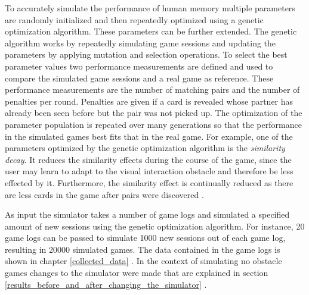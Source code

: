 To accurately simulate the performance of human memory multiple parameters are randomly initialized and then repeatedly optimized using a genetic optimization algorithm. These parameters can be further extended. The genetic algorithm works by repeatedly simulating game sessions and updating the parameters by applying mutation and selection operations. To select the best parameter values two performance measurements are defined and used to compare the simulated game sessions and a real game as reference. These performance measurements are the number of matching pairs and the number of penalties per round. Penalties are given if a card is revealed whose partner has already been seen before but the pair was not picked up. The optimization of the parameter population is repeated over many generations so that the performance in the simulated games best fits that in the real game. For example, one of the parameters optimized by the genetic optimization algorithm is the \textit{similarity decay}. It reduces the similarity effects during the course of the game, since the user may learn to adapt to the visual interaction obstacle and therefore be less effected by it. Furthermore, the similarity effect is continually reduced as there are less cards in the game after pairs were discovered \cite[p.~5]{blind}.

As input the simulator takes a number of game logs and simulated a specified amount of new sessions using the genetic optimization algorithm. For instance, 20 game logs can be passed to simulate 1000 new sessions out of each game log, resulting in 20000 simulated games. The data contained in the game logs is shown in chapter \ref{collected_data} . In the context of simulating no obstacle games changes to the simulator were made that are explained in section \ref{results_before_and_after_changing_the_simulator} .

